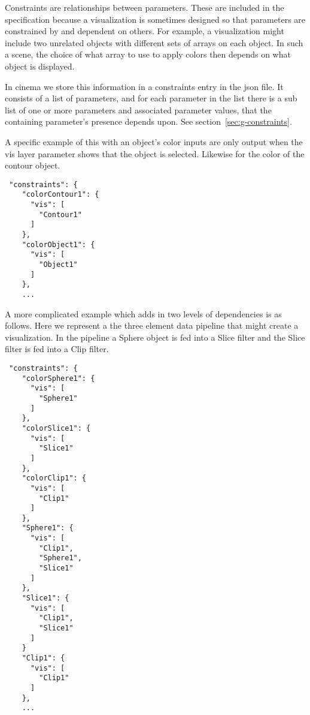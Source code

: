 \label{sec:CONSTRAINTS}

Constraints are relationships between parameters. These are included in the specification because a visualization is sometimes designed so that parameters are constrained by and dependent on others. For example, a visualization might include two unrelated objects with different sets of arrays on each object. In such a scene, the choice of what array to use to apply colors then depends on what object is displayed.



In cinema we store this information in a constraints entry in the json file. It consists of a list of parameters, and for each parameter in the list there is a sub list of one or more parameters and associated parameter values, that the containing parameter's presence depends upon. See section~\ref{sec:g-constraints}.

A specific example of this with an object's color inputs are only output when the vis layer parameter shows that the object is selected. Likewise for the color of the contour object.

\begin{verbatim}
 "constraints": {
    "colorContour1": {
      "vis": [
        "Contour1"
      ]
    },
    "colorObject1": {
      "vis": [
        "Object1"
      ]
    },
    ...
\end{verbatim}


A more complicated example which adds in two levels of dependencies is as follows. Here we represent a the three element data pipeline that might create a visualization. In the pipeline a Sphere object is fed into a Slice filter and the Slice filter is fed into a Clip filter.

\begin{verbatim}
 "constraints": {
    "colorSphere1": {
      "vis": [
        "Sphere1"
      ]
    },
    "colorSlice1": {
      "vis": [
        "Slice1"
      ]
    },
    "colorClip1": {
      "vis": [
        "Clip1"
      ]
    },
    "Sphere1": {
      "vis": [
        "Clip1",
        "Sphere1",
        "Slice1"
      ]
    },
    "Slice1": {
      "vis": [
        "Clip1",
        "Slice1"
      ]
    }
    "Clip1": {
      "vis": [
        "Clip1"
      ]
    },
    ...
\end{verbatim}

